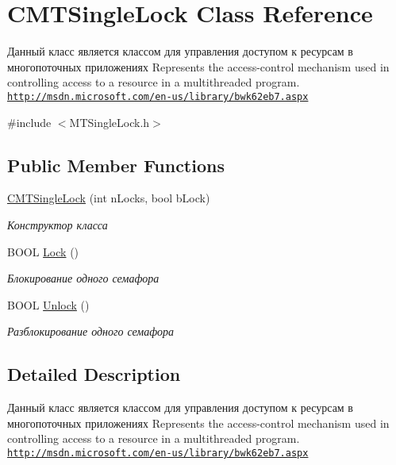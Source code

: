\hypertarget{class_c_m_t_single_lock}{\section{C\+M\+T\+Single\+Lock Class Reference}
\label{class_c_m_t_single_lock}
}


Данный класс является классом для управления доступом к ресурсам в многопоточных приложениях Represents the access-\/control mechanism used in controlling access to a resource in a multithreaded program. \href{http://msdn.microsoft.com/en-us/library/bwk62eb7.aspx}{\tt http\+://msdn.\+microsoft.\+com/en-\/us/library/bwk62eb7.\+aspx}  




{\ttfamily \#include $<$M\+T\+Single\+Lock.\+h$>$}

\subsection*{Public Member Functions}
\begin{DoxyCompactItemize}
\item 
\hyperlink{class_c_m_t_single_lock_accef84bf825a836b952f32223ec757bc}{C\+M\+T\+Single\+Lock} (int n\+Locks, bool b\+Lock)
\begin{DoxyCompactList}\small\item\em Конструктор класса \end{DoxyCompactList}\item 
B\+O\+O\+L \hyperlink{class_c_m_t_single_lock_a7586857614ac3719accc53d56e97573c}{Lock} ()
\begin{DoxyCompactList}\small\item\em Блокирование одного семафора \end{DoxyCompactList}\item 
B\+O\+O\+L \hyperlink{class_c_m_t_single_lock_a16f80923c0768c3814be13c4061d4c53}{Unlock} ()
\begin{DoxyCompactList}\small\item\em Разблокирование одного семафора \end{DoxyCompactList}\end{DoxyCompactItemize}


\subsection{Detailed Description}
Данный класс является классом для управления доступом к ресурсам в многопоточных приложениях Represents the access-\/control mechanism used in controlling access to a resource in a multithreaded program. \href{http://msdn.microsoft.com/en-us/library/bwk62eb7.aspx}{\tt http\+://msdn.\+microsoft.\+com/en-\/us/library/bwk62eb7.\+aspx} 



